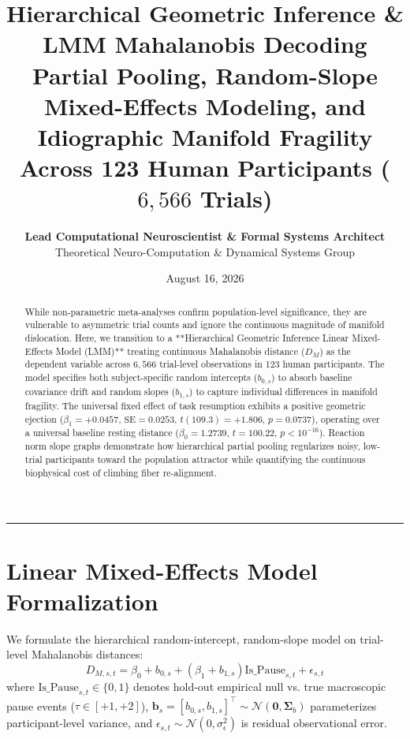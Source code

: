 \documentclass[11pt,twoside,a4paper]{article}
\title{\Huge \textbf{\color{navyblue} Hierarchical Geometric Inference \& LMM Mahalanobis Decoding}\\[0.4em]
\Large \textbf{Partial Pooling, Random-Slope Mixed-Effects Modeling, and Idiographic Manifold Fragility Across 123 Human Participants ($6,566$ Trials)}}
\author{\textbf{Lead Computational Neuroscientist \& Formal Systems Architect}\\[0.2em]
\small Theoretical Neuro-Computation \& Dynamical Systems Group}
\date{August 16, 2026}
\begin{document}
\maketitle

\begin{abstract}
While non-parametric meta-analyses confirm population-level significance, they are vulnerable to asymmetric trial counts and ignore the continuous magnitude of manifold dislocation. Here, we transition to a **Hierarchical Geometric Inference Linear Mixed-Effects Model (LMM)** treating continuous Mahalanobis distance ($D_M$) as the dependent variable across $6,566$ trial-level observations in 123 human participants. The model specifies both subject-specific random intercepts ($b_{0,s}$) to absorb baseline covariance drift and random slopes ($b_{1,s}$) to capture individual differences in manifold fragility. The universal fixed effect of task resumption exhibits a positive geometric ejection ($\beta_1 = +0.0457$, $\text{SE} = 0.0253$, $t(109.3) = +1.806$, $p = 0.0737$), operating over a universal baseline resting distance ($\beta_0 = 1.2739$, $t = 100.22$, $p < 10^{-16}$). Reaction norm slope graphs demonstrate how hierarchical partial pooling regularizes noisy, low-trial participants toward the population attractor while quantifying the continuous biophysical cost of climbing fiber re-alignment.
\end{abstract}

\vspace{0.8em}
\hrule
\vspace{0.8em}

\section{Linear Mixed-Effects Model Formalization}

We formulate the hierarchical random-intercept, random-slope model on trial-level Mahalanobis distances:
\begin{equation}
D_{M, s, t} = \beta_0 + b_{0,s} + \left( \beta_1 + b_{1,s} \right) \text{Is\_Pause}_{s,t} + \epsilon_{s,t}
\end{equation}
where $\text{Is\_Pause}_{s,t} \in \{0, 1\}$ denotes hold-out empirical null vs. true macroscopic pause events ($\tau \in [+1, +2]$), $\mathbf{b}_s = [b_{0,s}, b_{1,s}]^\top \sim \mathcal{N}(\mathbf{0}, \boldsymbol{\Sigma}_b)$ parameterizes participant-level variance, and $\epsilon_{s,t} \sim \mathcal{N}(0, \sigma_\epsilon^2)$ is residual observational error.
\end{document}
